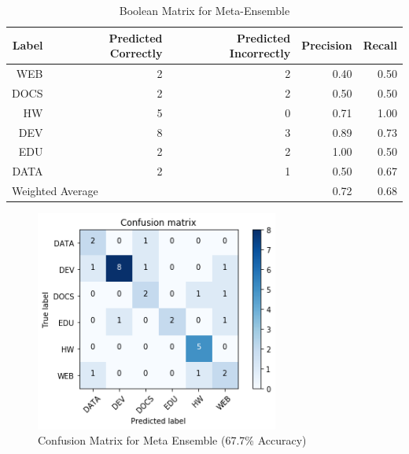 \documentclass[%
a4paper,
DIV12,
2.5headlines,
bigheadings,
titlepage,
openbib,
]{scrartcl}
\begin{document}
\begin{table}[H]
\centering
\caption{Boolean Matrix for Meta-Ensemble}
\label{boolean_matrix_meta_ensemble}
\begin{tabular}{|r|r|r|r|r|}
 \hline
 Label & Predicted Correctly & Predicted Incorrectly & Precision & Recall \\ \hline
 WEB & 2 & 2 & 0.40 & 0.50 \\ \hline
 DOCS & 2 & 2 & 0.50 & 0.50 \\ \hline
 HW & 5 & 0 & 0.71 & 1.00 \\ \hline
 DEV & 8 & 3 & 0.89 & 0.73 \\ \hline
 EDU & 2 & 2 & 1.00 & 0.50 \\ \hline
 DATA & 2 & 1 & 0.50 & 0.67 \\ \hline
 \multicolumn{3}{|l|}{Weighted Average} & 0.72 & 0.68 \\ \hline
 \end{tabular}
\end{table}

\begin{figure}[H]
	\centering
		\includegraphics[width=8cm]{graphics/confusion_matrix_meta_ensemble.png}
	\caption{Confusion Matrix for Meta Ensemble (67.7\% Accuracy)}
	\label{confusion_matrix_meta_ensemble}
\end{figure}
\end{document}
